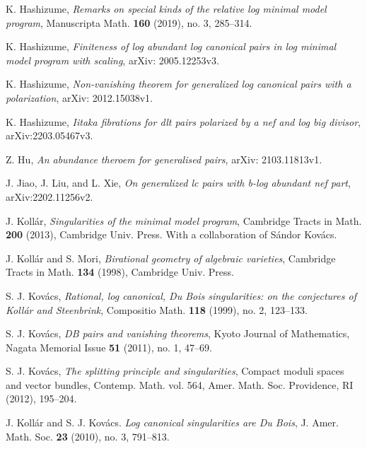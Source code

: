 \documentclass[11pt]{amsart}
\numberwithin{equation}{section}
\theoremstyle{definition}
\theoremstyle{definition}
\theoremstyle{definition}
\begin{document}
\begin{thebibliography}{ABCDE}
       K. Hashizume, \textit{Remarks on special
      kinds of the relative log minimal model program}, Manuscripta
      Math. \textbf{160} (2019), no. 3, 285--314.

       K. Hashizume, \textit{Finiteness of
        log abundant log canonical pairs in log minimal model program
      with scaling}, arXiv: 2005.12253v3.

       K. Hashizume, \textit{Non-vanishing
        theorem for generalized log canonical pairs with a
      polarization}, arXiv: 2012.15038v1.

       K. Hashizume, \textit{Iitaka fibrations
      for dlt pairs polarized by a nef and log big divisor}, arXiv:2203.05467v3.

       Z. Hu, \textit{An abundance theroem for
      generalised pairs}, arXiv: 2103.11813v1.

       J. Jiao, J. Liu, and L. Xie, \textit{On
      generalized lc pairs with b-log abundant nef part}, arXiv:2202.11256v2.

       J. Koll\'ar, \textit{Singularities of
      the minimal model program}, Cambridge Tracts in Math.
      \textbf{200} (2013), Cambridge Univ. Press. With a
      collaboration of S\'andor Kov\'acs.

       J. Koll\'{a}r and S. Mori,
      \textit{Birational geometry of algebraic varieties}, Cambridge
      Tracts in Math. \textbf{134} (1998), Cambridge Univ. Press.

       S. J. Kov\'acs, \textit{Rational, log
        canonical, Du Bois singularities: on the conjectures of
      Koll\'ar and Steenbrink}, Compositio Math. \textbf{118} (1999),
      no. 2, 123--133.

       S. J. Kov\'acs, \textit{DB pairs and
      vanishing theorems}, Kyoto Journal of Mathematics, Nagata
      Memorial Issue \textbf{51} (2011), no. 1, 47--69.

       S. J. Kov\'acs, \textit{The splitting
      principle and singularities}, Compact moduli spaces and vector
      bundles, Contemp. Math. vol. 564, Amer. Math. Soc. Providence,
      RI (2012), 195--204.

       J. Koll\'ar and S. J. Kov\'acs.
      \textit{Log canonical singularities are Du Bois}, J. Amer.
      Math. Soc. \textbf{23}  (2010), no. 3, 791--813.


\end{thebibliography}
\end{document}
